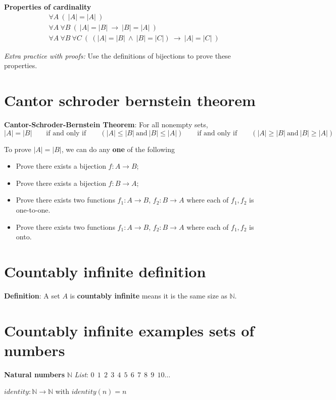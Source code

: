 \documentclass[12pt, oneside]{article}
\begin{document}
{\bf Properties of cardinality}
\begin{align*}
&\forall A ~ (~  |A| = |A| ~)\\
&\forall A ~ \forall B ~(~ |A| = |B|  ~\to ~ |B| = |A|~)\\
&\forall A ~ \forall B ~ \forall C~ (~ (|A| = |B| ~\wedge~ |B| = |C|) ~\to ~ |A| = |C|~)
\end{align*}

{\it Extra practice with proofs:} Use the definitions of bijections to prove these properties. \vfill
\section*{Cantor schroder bernstein theorem}


{\bf Cantor-Schroder-Bernstein Theorem}: For all nonempty sets,
\[
|A| = |B| \qquad\text{if and only if} \qquad (|A| \leq |B| ~\text{and}~ |B| \leq |A|)
\qquad\text{if and only if} \qquad (|A| \geq |B| ~\text{and}~ |B| \geq |A|)
\]

To prove $|A| = |B|$,  we can do any {\bf one} of the following

\begin{itemize}\setlength{\itemsep}{-5pt}
\item Prove there exists  a bijection $f:  A \to B$;
\item Prove there exists a  bijection  $f: B  \to  A$;
\item Prove there exists two functions $f_1: A \to B$, $f_2: B \to  A$ where each of $f_1, f_2$ is one-to-one.
\item Prove there exists two functions $f_1: A \to B$, $f_2: B \to  A$ where each of $f_1, f_2$ is onto.
\end{itemize} \vfill
\section*{Countably infinite definition}


{\bf Definition}: A set $A$ is {\bf countably infinite} means it is the 
same size as $\mathbb{N}$.

 \vfill
\section*{Countably infinite examples sets of numbers}


{\bf Natural numbers} $\mathbb{N}$ \hfill {\it List}:  $0~~1~~2~~3~~4~~5~~6~~7~~8~~9~~10 \ldots$

$identity: \mathbb{N} \to \mathbb{N}$ with $identity(n) = n$
\end{document}
